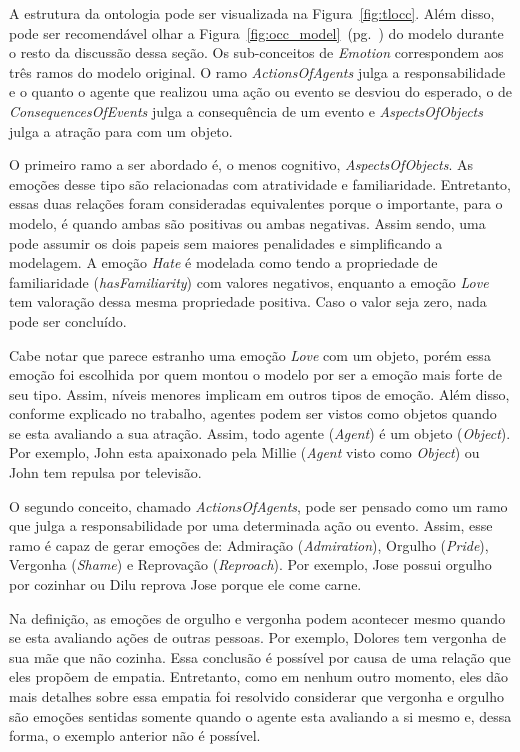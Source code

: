 A estrutura da ontologia pode ser visualizada na Figura~\ref{fig:tlocc}. Além
disso, pode ser recomendável olhar a
Figura~\ref{fig:occ_model}~(pg.~\pageref{fig:occ_model}) do modelo \occ
durante o resto da discussão dessa seção. Os sub-conceitos de \emph{Emotion}
correspondem aos três ramos do modelo original.
O ramo \emph{ActionsOfAgents} julga a responsabilidade e o quanto o agente que
realizou uma ação ou evento se desviou do esperado, o de
\emph{ConsequencesOfEvents} julga a consequência de um evento e
\emph{AspectsOfObjects} julga a atração para com um objeto.

O primeiro ramo a ser abordado é, o menos cognitivo, \emph{AspectsOfObjects}.
As emoções desse tipo são relacionadas com atratividade e familiaridade.
Entretanto, essas duas relações foram consideradas equivalentes porque o
importante, para o modelo, é quando ambas são positivas ou ambas negativas.
Assim sendo, uma pode assumir os dois papeis sem maiores penalidades e
simplificando a modelagem. A emoção \emph{Hate} é modelada como tendo a
propriedade de familiaridade (\emph{hasFamiliarity}) com valores negativos,
enquanto a emoção \emph{Love} tem valoração dessa mesma propriedade positiva.
Caso o valor seja zero, nada pode ser concluído.

Cabe notar que parece estranho uma emoção \emph{Love} com um objeto, porém
essa emoção foi escolhida por quem montou o modelo por ser a emoção mais forte
de seu tipo. Assim, níveis menores implicam em outros tipos de emoção. Além
disso, conforme explicado no trabalho, agentes podem ser vistos como objetos
quando se esta avaliando a sua atração. Assim, todo agente (\emph{Agent}) é um
objeto (\emph{Object}). Por exemplo, John esta apaixonado pela Millie
(\emph{Agent} visto como \emph{Object}) ou John tem repulsa por televisão.

O segundo conceito, chamado \emph{ActionsOfAgents}, pode ser pensado como
um ramo que julga a responsabilidade por uma determinada ação ou evento.
Assim, esse ramo é capaz de gerar emoções de: Admiração (\emph{Admiration}),
Orgulho (\emph{Pride}), Vergonha (\emph{Shame}) e Reprovação
(\emph{Reproach}). Por exemplo, Jose possui orgulho por cozinhar ou Dilu
reprova Jose porque ele come carne.

Na definição, as emoções de orgulho e vergonha podem acontecer mesmo quando se
esta avaliando ações de outras pessoas. Por exemplo, Dolores tem vergonha de
sua mãe que não cozinha. Essa conclusão é possível por causa de uma relação
que eles propõem de empatia. Entretanto, como em nenhum outro momento, eles
dão mais detalhes sobre essa empatia foi resolvido considerar que vergonha e
orgulho são emoções sentidas somente quando o agente esta avaliando a si mesmo
e, dessa forma, o exemplo anterior não é possível. \dev{}

